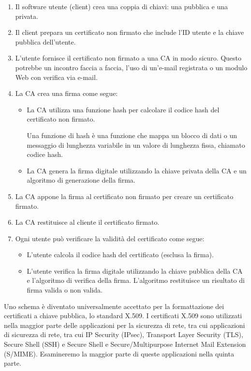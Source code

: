 \begin{enumerate}
    \item Il software utente (client) crea una coppia di chiavi: una pubblica e una privata.
    
    \item Il client prepara un certificato non firmato che include l'ID utente e la chiave pubblica dell'utente.
    
    \item L'utente fornisce il certificato non firmato a una CA in modo sicuro. Questo potrebbe un incontro faccia a faccia, l'uso di un'e-mail registrata o un modulo Web con verifica via e-mail.
    
    \item La CA crea una firma come segue:
        
        \begin{itemize}
            \item La CA utilizza una funzione hash per calcolare il codice hash del certificato non firmato.
            
            Una funzione di hash è una funzione che mappa un blocco di dati o un messaggio di lunghezza variabile in un valore di lunghezza fissa, chiamato codice hash.
            
            \item La CA genera la firma digitale utilizzando la chiave privata della CA e un algoritmo di generazione della firma.
            
        \end{itemize}
    
    \item La CA appone la firma al certificato non firmato per creare un certificato firmato.
    
    \item La CA restituisce al cliente il certificato firmato.
    
    \item Ogni utente può verificare la validità del certificato come segue:
        
        \begin{itemize}
            \item L'utente calcola il codice hash del certificato (esclusa la firma).
            
            \item L'utente verifica la firma digitale utilizzando la chiave pubblica della CA e l'algoritmo di verifica della firma. L'algoritmo restituisce un risultato di firma valida o non valida.
        \end{itemize}

\end{enumerate}
Uno schema è diventato universalmente accettato per la formattazione dei certificati a chiave pubblica, lo standard X.509. I certificati X.509 sono utilizzati nella maggior parte delle applicazioni per la sicurezza di rete, tra cui applicazioni di sicurezza di rete, tra cui IP Security (IPsec), Transport Layer Security (TLS), Secure Shell (SSH) e Secure Shell e Secure/Multipurpose Internet Mail Extension (S/MIME). Esamineremo la maggior parte di queste applicazioni nella quinta parte.

